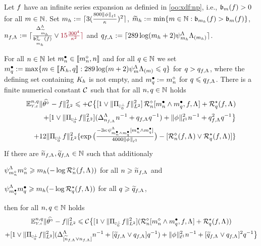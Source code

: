 \begin{lm}\label{re:au:ub:co3} Let $\xdf$ have an infinite series expansion
  as definied in \ref{oo:xdf:np}, i.e., $\bias(\xdf)>0$ for all
  $\Di\in\Nz$.  Set
  $\Di_{\ydf}:=\ceil{3(\tfrac{800\Vnormlp[1]{\fydf}}{\cpen})^2}$,
  $\tDi_{\ydf}:=\min\{\Di\in\Nz:\bias[\Di_{\ydf}](\xdf)>\bias[\Di](\xdf)\}$,
  $\ssY_{\xdf,\iSv}:=\ceil{\tfrac{\DipenSv[\tDi_{\ydf}]}{\bias[\tDi_{\ydf}]^2(\xdf)}\vee \dr15\tfrac{300^4}{\cpen^2}}$
  and $\ssE_{\xdf,\iSv}:=\ceil{289\log(\Di_{\ydf}+2)\cmiSv[\Di_{\ydf}]\miSv[\Di_{\ydf}]}$.

For  all  $\ssY\in\Nz$ let $\sDi{\ssY}\in\nset{\aDi{\ssY},\ssY}$ and for all $\ssE\in\Nz$ we set  
$\sDi{\ssE}:=\max\{\Di\in\nset{K_{\ydf},\ssE}:289\log(\Di+2)\cmiSv[\Di]\miSv[\Di]\leq\ssE\}$ for
$\ssE>\ssE_{\xdf,\iSv}$, where the defining set containing $K_{\ydf}$
 is not empty, and $\sDi{\ssE}:=\aDi{\ssY}$ for
$\ssE\leq\ssE_{\xdf,\iSv}$.
There is a finite numerical constant $\cst{}$ such that for all $\ssY,\ssE\in\Nz$ holds
\begin{multline}\label{re:au:ub:co3:e1}
\FuEx[\ssY,\ssE]{\rY,\rE}\VnormLp{\hxdfPr[]-\xdf}^2\leq
+\cst{}\big\{[1\vee\VnormLp{\Proj[{\mHiH[0]^\perp}]\xdf}^2]\,\hRaDi{\sDi{\ssY}\wedge\sDi{\ssE},\xdf,\iSv}+\mRa{\xdf,\iSv}\\
\hfill+[1\vee\VnormLp{\Proj[{\mHiH[0]^\perp}]\xdf}^2](\DipenSv[\ssY_{\xdf,\iSv}]\ssY^{-1}+\ssE_{\xdf,\iSv}\ssE^{-1})+\Vnormlp[1]{\fydf}^2\ssY^{-1}+\ssE_{\xdf,\iSv}^2\ssE^{-1}\big\}
\\
\hfill+12
\VnormLp{\Proj[{\mHiH[0]^\perp}]\xdf}^2\{\exp\big(\tfrac{-3\cpen\cmiSv[\sDi{\ssY}\wedge\sDi{\ssE}][\sDi{\ssY}\wedge\sDi{\ssE}]}{4000\Vnormlp[1]{\fydf}}\big)-[\hRa{\xdf,\iSv}\vee\mRa{\xdf,\iSv}]\}
\end{multline}
If there are
$\widetilde{\ssY}_{\xdf,\iSv},\widetilde{\ssE}_{\xdf,\iSv}\in\Nz$ such that
additionaly \begin{inparaenum}[i]\renewcommand{\theenumi}{\dgrau\rm(\roman{enumi})}\item\label{re:au:ub:co3:c1}
  $\cmiSv[\ndDi{\ssY}]\ndDi{\ssY}\geq \Di_{\ydf}(-\log\hRa{\xdf,\iSv})$ for all
  $\ssY\geq\widetilde{\ssY}_{\xdf,\iSv}$
  and  \item\label{re:au:ub:co3:c2}$\cmiSv[\sDi{\ssE}]\sDi{\ssE}\geq \Di_{\ydf}(-\log\mRa{\xdf,\iSv})$
  for all
  $\ssE\geq\widetilde{\ssE}_{\xdf,\iSv}$, \end{inparaenum}
then for all $\ssY,\ssE\in\Nz$ holds
\begin{multline}\label{re:au:ub:co3:e2}
\FuEx[\ssY,\ssE]{\rY,\rE}\VnormLp{\hxdfPr[]-\xdf}^2\leq
\cst{}\big\{[1\vee\VnormLp{\Proj[{\mHiH[0]^\perp}]\xdf}^2](\hRaDi{\aDi{\ssY}\wedge\sDi{\ssE},\xdf,\iSv}+\mRa{\xdf,\iSv})\\
\hfill+[1\vee\VnormLp{\Proj[{\mHiH[0]^\perp}]\xdf}^2](\DipenSv[{[\widetilde{\ssY}_{\xdf,\iSv}\vee\ssY_{\xdf,\iSv}]}]\ssY^{-1}+[\widetilde{\ssE}_{\xdf,\iSv}\vee\ssE_{\xdf,\iSv}]\ssE^{-1})+\Vnormlp[1]{\fydf}^2\ssY^{-1}+[\widetilde{\ssE}_{\xdf,\iSv}\vee\ssE_{\xdf,\iSv}]^2\ssE^{-1}\big\}
\end{multline}
\end{lm}
